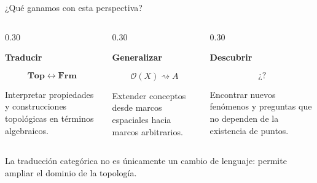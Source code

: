 \documentclass[compress,12pt]{beamer}
\begin{document}
\begin{frame}{¿Qué ganamos con esta perspectiva?}

\begin{columns}[T]

\begin{column}{0.30\textwidth}
\centering

\Large
\textbf{Traducir}

\normalsize
\medskip

\[
\mathbf{Top}
\longleftrightarrow
\mathbf{Frm}
\]

\medskip

Interpretar propiedades y construcciones topológicas
en términos algebraicos.

\end{column}

\pause

\begin{column}{0.30\textwidth}
\centering

\Large
\textbf{Generalizar}

\normalsize
\medskip

\[
\mathcal O(X)
\rightsquigarrow
A
\]

\medskip

Extender conceptos desde marcos espaciales
hacia marcos arbitrarios.

\end{column}

\pause

\begin{column}{0.30\textwidth}
\centering

\Large
\textbf{Descubrir}

\normalsize
\medskip

\[
\text{¿?}
\]

\medskip

Encontrar nuevos fenómenos y preguntas
que no dependen de la existencia de puntos.

\end{column}

\end{columns}

\vfill

\begin{block}{}
\centering
La traducción categórica no es únicamente un cambio de lenguaje:
permite ampliar el dominio de la topología.
\end{block}

\end{frame}
\end{document}
